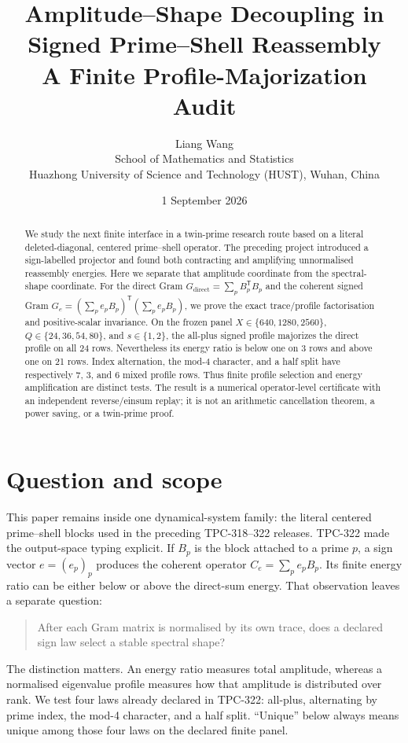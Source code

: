 \documentclass[10pt]{article}
\title{Amplitude--Shape Decoupling in Signed Prime--Shell Reassembly\\
       A Finite Profile-Majorization Audit}
\author{Liang Wang\\
School of Mathematics and Statistics\\
Huazhong University of Science and Technology (HUST), Wuhan, China}
\date{1 September 2026}
\begin{document}
\maketitle

\begin{abstract}
We study the next finite interface in a twin-prime research route based on a
literal deleted-diagonal, centered prime--shell operator.  The preceding
project introduced a sign-labelled projector and found both contracting and
amplifying unnormalised reassembly energies.  Here we separate that amplitude
coordinate from the spectral-shape coordinate.  For the direct Gram
\(G_{\mathrm{direct}}=\sum_p B_p^{\mathsf T}B_p\) and the coherent signed Gram
\(G_e=(\sum_p e_pB_p)^{\mathsf T}(\sum_p e_pB_p)\), we prove the exact
trace/profile factorisation and positive-scalar invariance.  On the frozen
panel \(X\in\{640,1280,2560\}\), \(Q\in\{24,36,54,80\}\), and
\(s\in\{1,2\}\), the all-plus signed profile majorizes the direct profile on
all 24 rows.  Nevertheless its energy ratio is below one on 3 rows and above
one on 21 rows.  Index alternation, the mod-4 character, and a half split have
respectively 7, 3, and 6 mixed profile rows.  Thus finite profile selection
and energy amplification are distinct tests.  The result is a numerical
operator-level certificate with an independent reverse/einsum replay; it is
not an arithmetic cancellation theorem, a power saving, or a twin-prime
proof.
\end{abstract}

\section{Question and scope}

This paper remains inside one dynamical-system family: the literal centered
prime--shell blocks used in the preceding TPC-318--322 releases.  TPC-322
made the output-space typing explicit.  If \(B_p\) is the block attached to a
prime \(p\), a sign vector \(e=(e_p)_p\) produces the coherent operator
\(C_e=\sum_pe_pB_p\).  Its finite energy ratio can be either below or above
the direct-sum energy.  That observation leaves a separate question:

\begin{quote}
After each Gram matrix is normalised by its own trace, does a declared sign
law select a stable spectral shape?
\end{quote}

The distinction matters.  An energy ratio measures total amplitude, whereas a
normalised eigenvalue profile measures how that amplitude is distributed over
rank.  We test four laws already declared in TPC-322: all-plus, alternating by
prime index, the mod-4 character, and a half split.  ``Unique'' below always
means unique among those four laws on the declared finite panel.
\end{document}
